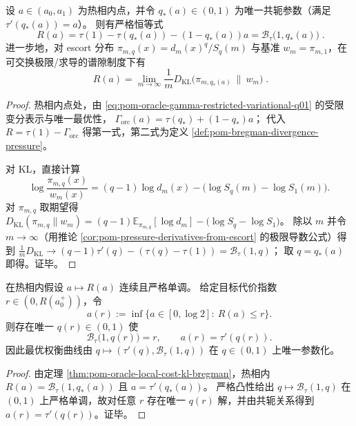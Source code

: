 \begin{theorem}\label{thm:pom-oracle-local-cost-kl-bregman}
设 \(a\in(a_0,a_1)\) 为热相内点，并令 \(q_*(a)\in(0,1)\) 为唯一共轭参数（满足 \(\tau'(q_*(a))=a\)）。
则有严格恒等式
\[
\boxed{\;
R(a)=\tau(1)-\tau(q_*(a))-(1-q_*(a))a
=\mathcal{B}_{\tau}\bigl(1,q_*(a)\bigr)\; } .
\]
进一步地，对 escort 分布 \(\pi_{m,q}(x)=d_m(x)^q/S_q(m)\) 与基准 \(w_m=\pi_{m,1}\)，在可交换极限/求导的谱隙制度下有
\[
\boxed{\;
R(a)=\lim_{m\to\infty}\frac{1}{m}D_{\mathrm{KL}}\!\bigl(\pi_{m,q_*(a)}\ \|\ w_m\bigr)\; } .
\]
\end{theorem}
\begin{proof}
热相内点处，由 \eqref{eq:pom-oracle-gamma-restricted-variational-q01} 的受限变分表示与唯一最优性，
\(
\Gamma_{\mathrm{orc}}(a)=\tau(q_*)+(1-q_*)a
\)；
代入 \(R=\tau(1)-\Gamma_{\mathrm{orc}}\) 得第一式，第二式为定义 \ref{def:pom-bregman-divergence-pressure}。
\par
对 KL，直接计算
\[
\log\frac{\pi_{m,q}(x)}{w_m(x)}
=(q-1)\log d_m(x)-\bigl(\log S_q(m)-\log S_1(m)\bigr).
\]
对 \(\pi_{m,q}\) 取期望得
\(
D_{\mathrm{KL}}(\pi_{m,q}\|w_m)=(q-1)\mathbb{E}_{\pi_{m,q}}[\log d_m]-\bigl(\log S_q-\log S_1\bigr)
\)。
除以 \(m\) 并令 \(m\to\infty\)（用推论 \ref{cor:pom-pressure-derivatives-from-escort} 的极限导数公式）得到
\(
\frac{1}{m}D_{\mathrm{KL}}\to (q-1)\tau'(q)-(\tau(q)-\tau(1))
=\mathcal{B}_{\tau}(1,q)
\)；
取 \(q=q_*(a)\) 即得。证毕。
\end{proof}

\begin{corollary}\label{cor:pom-oracle-rate-budget-bregman-isodistance}
在热相内假设 \(a\mapsto R(a)\) 连续且严格单调。
给定目标代价指数 \(r\in(0,R(a_0^+))\)，令
\[
a(r):=\inf\{a\in[0,\log 2]:\ R(a)\le r\}.
\]
则存在唯一 \(q(r)\in(0,1)\) 使
\[
\mathcal{B}_{\tau}\bigl(1,q(r)\bigr)=r,
\qquad
a(r)=\tau'(q(r)).
\]
因此最优权衡曲线由 \(q\mapsto(\tau'(q),\mathcal{B}_{\tau}(1,q))\) 在 \(q\in(0,1)\) 上唯一参数化。
\end{corollary}
\begin{proof}
由定理 \ref{thm:pom-oracle-local-cost-kl-bregman}，热相内 \(R(a)=\mathcal{B}_{\tau}(1,q_*(a))\) 且 \(a=\tau'(q_*(a))\)。
严格凸性给出 \(q\mapsto \mathcal{B}_{\tau}(1,q)\) 在 \((0,1)\) 上严格单调，故对任意 \(r\) 存在唯一 \(q(r)\) 解，并由共轭关系得到 \(a(r)=\tau'(q(r))\)。证毕。
\end{proof}

